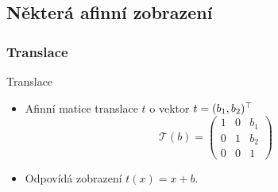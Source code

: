\subsection{Některá afinní zobrazení}

\subsubsection{Translace}
\begin{frame}[t]{Translace}
    \begin{itemize}
        \item Afinní matice translace $t$ o vektor $t=(b_1,b_2)^\top$
        \[\mathcal{T}(b)=\left(\begin{matrix}
            1 & 0 & b_1\\
            0 & 1 & b_2\\
            0 & 0 & 1
        \end{matrix}\right)\]
        \item Odpovídá zobrazení $t(x)=x+b$.
    \end{itemize}
\end{frame}

